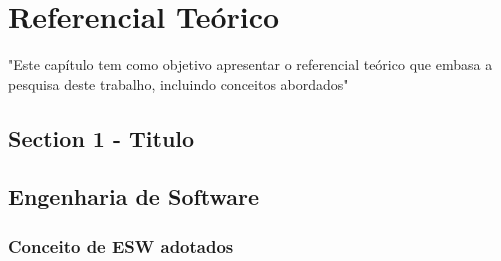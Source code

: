 

\chapter[Referencial Teórico]{Referencial Teórico}

"Este capítulo tem como objetivo apresentar o referencial teórico que embasa a pesquisa deste trabalho, incluindo conceitos abordados"

\section{Section 1 - Titulo}

\section{Engenharia de Software}



\subsection{Conceito de ESW adotados}
